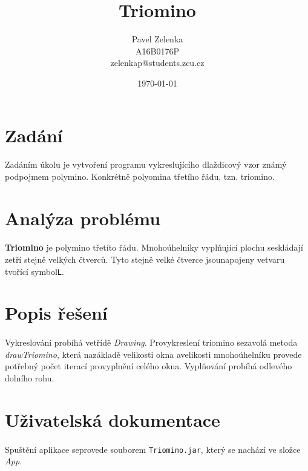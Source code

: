 \documentclass[12pt]{scrartcl}
\author{Pavel Zelenka\\A16B0176P\\zelenkap@students.zcu.cz}
\date{\today}
\title{Triomino}
\begin{document}
\maketitle
{}
\newpage
{}
\newpage
\section{Zadání}
	
\paragraph{}
Zadáním úkolu je vytvoření programu vykreslujícího dlaždicový vzor známý pod\nobreakspace pojmem polymino. Konkrétně polyomina třetího řádu, tzn. triomino.


\section{Analýza problému}

\paragraph{}
\textbf{Triomino} je polymino třetíto řádu. Mnohoúhelníky vyplňující plochu se\nobreakspace skládají ze\nobreakspace tří stejně velkých čtverců. Tyto stejně velké čtverce jsou\nobreakspace napojeny ve\nobreakspace tvaru tvořící symbol\nobreakspace \texttt{L}.

\section{Popis řešení}

\paragraph{}
Vykreslování probíhá ve\nobreakspace třídě \emph{Drawing}. Pro\nobreakspace vykreslení triomino se\nobreakspace zavolá metoda \emph{\mbox{drawTriomino}}, která na\nobreakspace základě velikosti okna a\nobreakspace velikosti mnohoúhelníku provede potřebný počet iterací pro\nobreakspace vyplnění celého okna. Vyplňování probíhá od\nobreakspace levého dolního rohu.

\section{Uživatelská dokumentace}

\paragraph{}
Spuštění aplikace se\nobreakspace provede souborem \texttt{Triomino.jar}, který se nachází ve složce \emph{App}.
\end{document}
